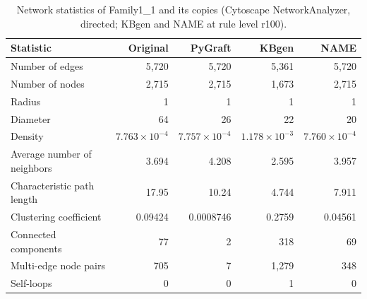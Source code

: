 \begin{table}[t]
\centering
\caption{Network statistics of Family1\_1 and its copies (Cytoscape NetworkAnalyzer, directed; KBgen and NAME at rule level r100).}
\label{tab:cytoscape_Family1_1}
\begin{tabular}{lrrrr}
\toprule
Statistic & Original & PyGraft & KBgen & NAME \\
\midrule
Number of edges & 5{,}720 & 5{,}720 & 5{,}361 & 5{,}720 \\
Number of nodes & 2{,}715 & 2{,}715 & 1{,}673 & 2{,}715 \\
Radius & 1 & 1 & 1 & 1 \\
Diameter & 64 & 26 & 22 & 20 \\
Density & $7.763\times10^{-4}$ & $7.757\times10^{-4}$ & $1.178\times10^{-3}$ & $7.760\times10^{-4}$ \\
Average number of neighbors & 3.694 & 4.208 & 2.595 & 3.957 \\
Characteristic path length & 17.95 & 10.24 & 4.744 & 7.911 \\
Clustering coefficient & 0.09424 & 0.0008746 & 0.2759 & 0.04561 \\
Connected components & 77 & 2 & 318 & 69 \\
Multi-edge node pairs & 705 & 7 & 1{,}279 & 348 \\
Self-loops & 0 & 0 & 1 & 0 \\
\bottomrule
\end{tabular}
\end{table}
